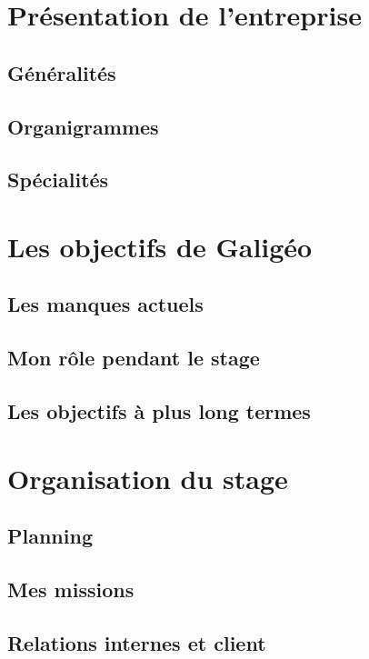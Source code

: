 
\section{Présentation de l'entreprise}

\subsection{Généralités}
\subsection{Organigrammes}
\subsection{Spécialités}

\section{Les objectifs de Galigéo}

\subsection{Les manques actuels}
\subsection{Mon rôle pendant le stage}
\subsection{Les objectifs à plus long termes}

\section{Organisation du stage}

\subsection{Planning}
\subsection{Mes missions}
\subsection{Relations internes et client}